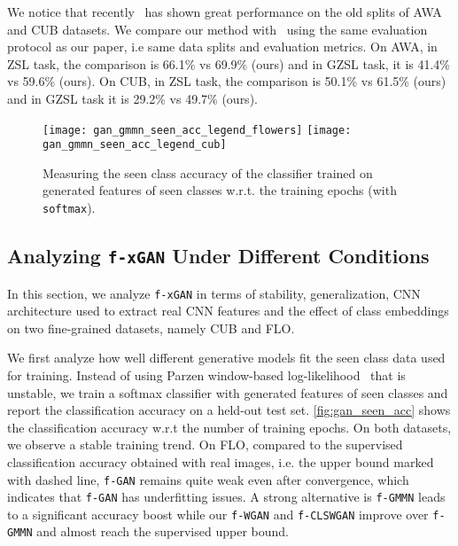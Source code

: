 \documentclass[10pt,twocolumn,letterpaper]{article}
\newcommand{\myparagraph}[1]{\vspace{6pt}\noindent{\bf #1}}
\def\mthd{\texttt{f-xGAN}\xspace}
\begin{document}
We notice that recently~\cite{zhang2016learning} has shown great performance on the old splits of AWA and CUB datasets. We compare our method with~\cite{zhang2016learning} using the same evaluation protocol as our paper, i.e same data splits and evaluation metrics. On AWA, in ZSL task, the comparison is 66.1\% vs 69.9\% (ours) and in GZSL task,  it is 41.4\% vs 59.6\% (ours). On CUB, in ZSL task, the comparison is 50.1\% vs 61.5\% (ours) and in GZSL task it is 29.2\% vs 49.7\% (ours). 

\begin{figure}[t]
	\centering
        \texttt{[image: gan\_gmmn\_seen\_acc\_legend\_flowers]} 
		\texttt{[image: gan\_gmmn\_seen\_acc\_legend\_cub]}       
\caption{Measuring the seen class accuracy of the classifier trained on generated features of seen classes w.r.t. the training epochs (with \texttt{softmax}).} 
\vspace{-3mm}
	\label{fig:gan_seen_acc}
\end{figure}



\subsection{Analyzing \mthd Under Different Conditions}
In this section, we analyze \mthd in terms of stability, generalization, CNN architecture used to extract real CNN features and the effect of class embeddings on two fine-grained datasets, namely CUB and FLO. 

\myparagraph{Stability and Generalization.} We first analyze how well different generative models fit the seen class data used for training. Instead of using Parzen window-based log-likelihood~\cite{GPMXWDOCB14} that is unstable, we train a softmax classifier with generated features of seen classes and report the classification accuracy on a held-out test set. \autoref{fig:gan_seen_acc} shows the classification accuracy w.r.t the number of training epochs. On both datasets, we observe a stable training trend. On FLO, compared to the supervised classification accuracy obtained with real images, i.e. the upper bound marked with dashed line, \texttt{f-GAN} remains quite weak even after convergence, which indicates that \texttt{f-GAN} has underfitting issues. A strong alternative is \texttt{f-GMMN} leads to a significant accuracy boost while our \texttt{f-WGAN} and \texttt{f-CLSWGAN} improve over \texttt{f-GMMN} and almost reach the supervised upper bound. 
\end{document}

